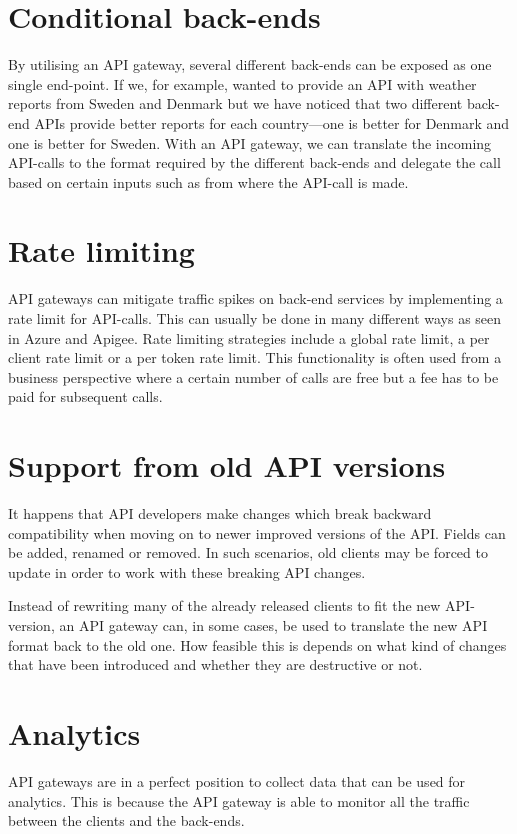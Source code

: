\documentclass{cslthse-msc}
\begin{document}
\section{Conditional back-ends}
By utilising an API gateway, several different back-ends can be exposed as one single end-point. If we, for example, wanted to provide an API with weather reports from Sweden and Denmark but we have noticed that two different back-end APIs provide better reports for each country---one is better for Denmark and one is better for Sweden. With an API gateway, we can translate the incoming API-calls to the format required by the different back-ends and delegate the call based on certain inputs such as from where the API-call is made.

\section{Rate limiting}
API gateways can mitigate traffic spikes on back-end services by implementing a rate limit for API-calls. This can usually be done in many different ways as seen in Azure\cite{azure_rate_limit} and Apigee\cite{apigee_rate_limit}. Rate limiting strategies include a global rate limit, a per client rate limit or a per token rate limit. This functionality is often used from a business perspective where a certain number of calls are free but a fee has to be paid for subsequent calls.

\section{Support from old API versions}
It happens that API developers make changes which break backward compatibility when moving on to newer improved versions of the API. Fields can be added, renamed or removed. In such scenarios, old clients may be forced to update in order to work with these breaking API changes.

Instead of rewriting many of the already released clients to fit the new API-version, an API gateway can, in some cases, be used to translate the new API format back to the old one. How feasible this is depends on what kind of changes that have been introduced and whether they are destructive or not.

\section{Analytics}
API gateways are in a perfect position to collect data that can be used for analytics. This is because the API gateway is able to monitor all the traffic between the clients and the back-ends. 
\end{document}
